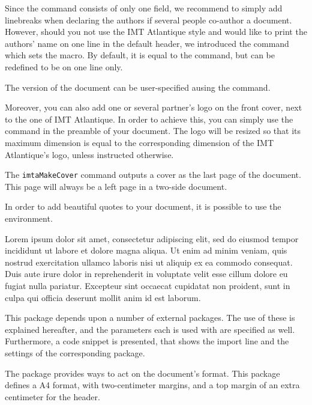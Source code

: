 \documentclass{report}
\begin{document}
Since the  command consists of only one field, we recommend to simply add linebreaks when declaring the authors if several people co-author a document. 
However, should you not use the IMT Atlantique style and would like to print the authors' name on one line in the default header, we introduced the  command which sets the  macro. 
By default, it is equal to the  command, but can be redefined to be on one line only.

The version of the document can be user-specified ausing the  command.

Moreover, you can also add one or several partner's logo on the front cover, next to the one of IMT Atlantique. 
In order to achieve this, you can simply use the  command in the preamble of your document. 
The logo will be resized so that its maximum dimension is equal to the corresponding dimension of the IMT Atlantique's logo, unless instructed otherwise.



The \texttt{imtaMakeCover} command outputs a cover as the last page of the document.
This page will always be a left page in a two-side document.


\label{sec:core:quote}
In order to add beautiful quotes to your document, it is possible to use the  environment.

\begin{imtaQuote}
Lorem ipsum dolor sit amet, consectetur adipiscing elit, sed do eiusmod tempor incididunt ut labore et dolore magna aliqua. 
Ut enim ad minim veniam, quis nostrud exercitation ullamco laboris nisi ut aliquip ex ea commodo consequat. 
Duis aute irure dolor in reprehenderit in voluptate velit esse cillum dolore eu fugiat nulla pariatur.
Excepteur sint occaecat cupidatat non proident, sunt in culpa qui officia deserunt mollit anim id est laborum.
\end{imtaQuote}



This package depends upon a number of external packages.
The use of these is explained hereafter, and the parameters each is used with are specified as well.
Furthermore, a code snippet is presented, that shows the import line and the settings of the corresponding package.


The  package provides ways to act on the document's format.
This package defines a A4 format, with two-centimeter margins, and a top margin of an extra centimeter for the header.
\end{document}
